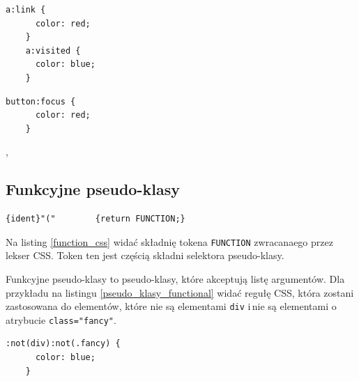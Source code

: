 \documentclass[a4paper,12pt]{book} %
\begin{document}
\begin{lstfloat}[hb]
  \lstset{language=HTML}
  \begin{lstlisting}[frame=single]
    a:link {
      color: red;
    }
    a:visited {
      color: blue;
    }\end{lstlisting}

  \caption{Reguły zmieniające kolor linku zależnie od jego stanu}
  \label{pseudo_klasy_visited}

\end{lstfloat}







\begin{lstfloat}[hb]
  \lstset{language=HTML}
  \begin{lstlisting}[frame=single]
    button:focus {
      color: red;
    }\end{lstlisting}

  \caption{Reguła zmieniająca kolor przycisku, gdy otrzymuje skupienie},
  \label{pseudo_klasy_focus}

\end{lstfloat}


\clearpage\subsection{Funkcyjne pseudo-klasy}
\begin{lstfloat}[hb]
  \lstset{language=HTML}
  \begin{lstlisting}[frame=single]
  {ident}"("		{return FUNCTION;}
\end{lstlisting}
  \caption{Składnia tokena \lstinline|FUNCTION| zwracanego przez lekser CSS \cite{GrammarofCSS}}\label{function_css}
\end{lstfloat}

Na listing \ref{function_css} widać składnię tokena \lstinline|FUNCTION| zwracanaego przez lekser CSS. Token ten jest częścią składni selektora pseudo-klasy.

Funkcyjne pseudo-klasy to pseudo-klasy, które akceptują listę argumentów. Dla przykładu na listingu \ref{pseudo_klasy_functional} widać regułę CSS, która zostani zastosowana do elementów, które nie są elementami \lstinline|div| i\,nie są elementami o\,atrybucie \lstinline{class="fancy"}.



\begin{lstfloat}[hb]
  \lstset{language=HTML}
  \begin{lstlisting}[frame=single]
    :not(div):not(.fancy) {
      color: blue;
    }\end{lstlisting}

  \caption{Reguła z selektorem elementów, które nie są elementami \lstinline|div| i\,nie są elementami o\,atrybucie \lstinline{class="fancy"}}
  \label{pseudo_klasy_functional}

\end{lstfloat}
\end{document}
